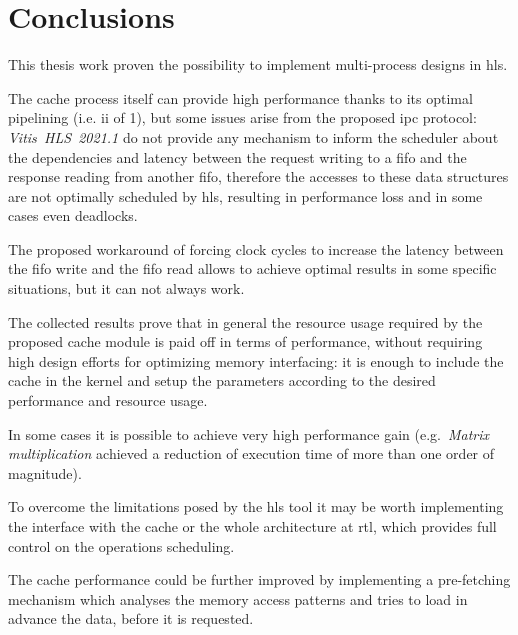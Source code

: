 \documentclass[11pt,a4paper,oneside]{memoir}
\begin{document}
\chapter{Conclusions}
This thesis work proven the possibility to implement multi-process designs in
\ac{hls}.

The cache process itself can provide high performance thanks to its optimal
pipelining (i.e. \ac{ii} of 1), but some issues arise from the proposed
\acl{ipc} protocol: \emph{Vitis~HLS~2021.1} do not provide any mechanism to
inform the scheduler about the dependencies and latency between the request
writing to a \ac{fifo} and the response reading from another \ac{fifo},
therefore the accesses to these data structures are not optimally scheduled by
\ac{hls}, resulting in performance loss and in some cases even deadlocks.

The proposed workaround of forcing clock cycles to increase the latency between
the \ac{fifo} write and the \ac{fifo} read allows to achieve optimal results in
some specific situations, but it can not always work.

\bigskip
The collected results prove that in general the resource usage required by the
proposed cache module is paid off in terms of performance, without requiring
high design efforts for optimizing memory interfacing: it is enough to include
the cache in the kernel and setup the parameters according to the desired
performance and resource usage.

In some cases it is possible to achieve very high performance gain (e.g.\
\emph{Matrix multiplication} achieved a reduction of execution time of more
than one order of magnitude).

\bigskip
To overcome the limitations posed by the \ac{hls} tool it may be worth
implementing the interface with the cache or the whole architecture at
\ac{rtl}, which provides full control on the operations scheduling.

The cache performance could be further improved by implementing a pre-fetching
mechanism which analyses the memory access patterns and tries to load in advance
the data, before it is requested.

\backmatter

\printbibliography
\end{document}
